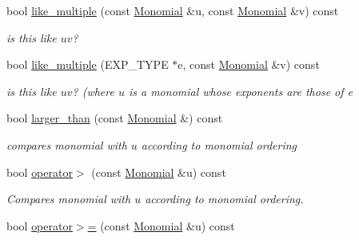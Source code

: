 \begin{Indent}
\begin{DoxyCompactItemize}
\mbox{\label{group__polygroup_adec4a37e9e36f821ae69ca00eb087961}} 
bool \hyperlink{group__polygroup_adec4a37e9e36f821ae69ca00eb087961}{like\+\_\+multiple} (const \hyperlink{group__polygroup_class_monomial}{Monomial} \&u, const \hyperlink{group__polygroup_class_monomial}{Monomial} \&v) const
\begin{DoxyCompactList}\small\item\em is {\ttfamily this} like $uv$? \end{DoxyCompactList}\item 
\mbox{\label{group__polygroup_ab2989052f946017870269c19b2108b55}} 
bool \hyperlink{group__polygroup_ab2989052f946017870269c19b2108b55}{like\+\_\+multiple} (E\+X\+P\+\_\+\+T\+Y\+PE $\ast$e, const \hyperlink{group__polygroup_class_monomial}{Monomial} \&v) const
\begin{DoxyCompactList}\small\item\em is {\ttfamily this} like $uv$? (where $u$ is a monomial whose exponents are those of {\ttfamily e} \end{DoxyCompactList}\item 
\mbox{\label{group__polygroup_ab50a4f90c210bcaf6e21fc16028a121a}} 
bool \hyperlink{group__polygroup_ab50a4f90c210bcaf6e21fc16028a121a}{larger\+\_\+than} (const \hyperlink{group__polygroup_class_monomial}{Monomial} \&) const
\begin{DoxyCompactList}\small\item\em compares monomial with $u$ according to monomial ordering \end{DoxyCompactList}\item 
\mbox{\label{group__polygroup_ad660e085a10e15ba0e13bcd9790994d0}} 
bool \hyperlink{group__polygroup_ad660e085a10e15ba0e13bcd9790994d0}{operator$>$} (const \hyperlink{group__polygroup_class_monomial}{Monomial} \&u) const
\begin{DoxyCompactList}\small\item\em Compares monomial with $u$ according to monomial ordering. \end{DoxyCompactList}\item 
\mbox{\label{group__polygroup_ae6607ae89a4e6ee332b3a69266d133d9}} 
bool \hyperlink{group__polygroup_ae6607ae89a4e6ee332b3a69266d133d9}{operator$>$=} (const \hyperlink{group__polygroup_class_monomial}{Monomial} \&u) const

\end{DoxyCompactItemize}
\end{Indent}
